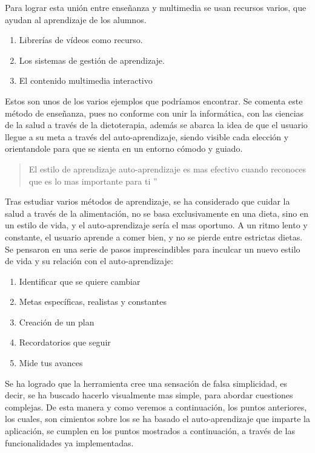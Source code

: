 Para lograr esta unión entre enseñanza y multimedia se usan recursos varios, que ayudan al aprendizaje de los alumnos.
\begin{enumerate}
\item Librerías de vídeos como recurso.
\item Los sistemas de gestión de aprendizaje.
\item El contenido multimedia interactivo
\end{enumerate}
Estos son unos de los varios ejemplos que podríamos encontrar. Se comenta este método de enseñanza, pues no conforme con unir la informática, con las ciencias de la salud a través de la dietoterapia, además se abarca la idea de que el usuario llegue a su meta a través del auto-aprendizaje, siendo visible cada elección y orientandole para que se sienta en un entorno cómodo y guiado.
\begin{quote}
El estilo de aprendizaje auto-aprendizaje es mas efectivo cuando reconoces que es lo mas importante para ti ”
\cite{autoaprendizaje}
\end{quote}
Tras estudiar varios métodos de aprendizaje, se ha considerado que cuidar la salud a través de la alimentación, no se basa exclusivamente en una dieta, sino en un estilo de vida, y el auto-aprendizaje sería el mas oportuno. A un ritmo lento y constante, el usuario aprende a comer bien, y no se pierde entre estrictas dietas.\\

Se pensaron en una serie de pasos imprescindibles para inculcar un nuevo estilo de vida y su relación con el auto-aprendizaje:
\begin{enumerate}
\item	Identificar que se quiere cambiar
\item	Metas específicas, realistas y constantes
\item	Creación de un plan
\item	Recordatorios que seguir
\item	Mide tus avances
\end{enumerate}
Se ha logrado que la herramienta cree una sensación de falsa simplicidad, es decir, se ha buscado hacerlo visualmente mas simple, para abordar cuestiones complejas. De esta manera y como veremos a continuación, los puntos anteriores, los cuales, son cimientos sobre los se ha basado el auto-aprendizaje que imparte la aplicación, se cumplen en los puntos mostrados a continuación, a través de las funcionalidades ya implementadas.

